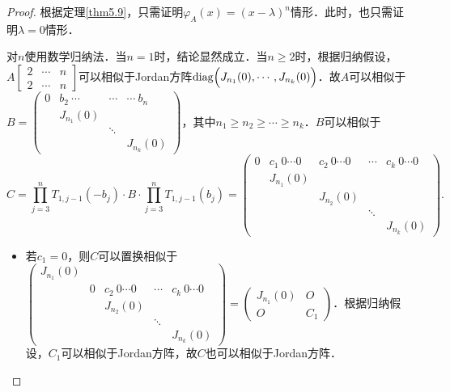 \documentclass[a4paper,fontset=windows]{ctexbook}
\theoremstyle{definition}
\DeclareMathOperator{\diag}{diag}
\renewcommand{\ge}{\geqslant}
\begin{document}
\begin{proof}
根据定理\ref{thm5.9}，只需证明$\varphi_A(x)=(x-\lambda)^n$情形．此时，也只需证明$\lambda=0$情形．

对$n$使用数学归纳法．当$n=1$时，结论显然成立．当$n\ge 2$时，根据归纳假设，$A[\begin{smallmatrix}2&\cdots&n \\ 2&\cdots&n\end{smallmatrix}]$可以相似于Jordan方阵$\diag\Bigl(J_{n_1}(0),\cdots,J_{n_k}(0)\Bigr)$．故$A$可以相似于$B=\begin{pmatrix}0&b_2~\cdots&\cdots&\cdots~b_n \\ &J_{n_1}(0)&& \\ &&\ddots& \\ &&&J_{n_k}(0)\end{pmatrix}$，其中$n_1\ge n_2\ge\cdots\ge n_k$．$B$可以相似于
$$C=\prod\limits_{j=3}^nT_{1,j-1}(-b_j)\cdot B\cdot \prod\limits_{j=3}^nT_{1,j-1}(b_j)=\begin{pmatrix}0&c_1~0\cdots 0&c_2~0\cdots 0&\cdots&c_k~0\cdots 0 \\ &J_{n_1}(0)&&& \\ &&J_{n_2}(0)&& \\ &&&\ddots& \\ &&&&J_{n_k}(0)\end{pmatrix}.$$
\begin{itemize}
\item 若$c_1=0$，则$C$可以置换相似于$\begin{pmatrix}J_{n_1}(0)&&&& \\ &0&c_2~0\cdots 0&\cdots&c_k~0\cdots 0 \\ &&J_{n_2}(0)&& \\ &&&\ddots& \\ &&&&J_{n_k}(0)\end{pmatrix}=\begin{pmatrix}J_{n_1}(0)&O \\ O&C_1\end{pmatrix}$．根据归纳假设，$C_1$可以相似于Jordan方阵，故$C$也可以相似于Jordan方阵．


\end{itemize}
\end{proof}
\end{document}
